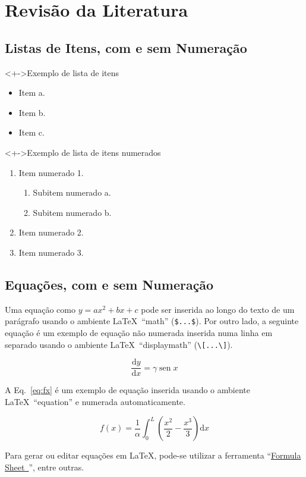 \documentclass[%
  10pt,%
  aspectratio = 43,%
  compress,%
  t,%
  english,%
  brazilian,%
]{beamer}
\begin{document}
\section{Revisão da Literatura}\label{sec:revlit}

\subsection{Listas de Itens, com e sem Numeração}\label{ssec:revlit1}

\begin{frame}
\begin{block}<+->{Exemplo de lista de itens}
\begin{itemize}
\item Item a.
\item Item b.
\item Item c.
\end{itemize}
\end{block}
\begin{block}<+->{Exemplo de lista de itens numerados}
\begin{enumerate}[<+-|alert@+>]
\item Item numerado 1.
\begin{enumerate}[a]
\item Subitem numerado a.
\item Subitem numerado b.
\end{enumerate}
\item Item numerado 2.
\item Item numerado 3.
\end{enumerate}
\end{block}
\end{frame}

\subsection{Equações, com e sem Numeração}\label{ssec:revlit2}

\begin{frame}[fragile = singleslide]
Uma equação como $y = a x^2 + b x + c$ pode ser inserida ao longo do texto de um parágrafo usando o ambiente \LaTeX\ \enquote{math} (\verb|$...$|).
Por outro lado, a seguinte equação é um exemplo de equação não numerada inserida numa linha em separado usando o ambiente \LaTeX\ \enquote{displaymath} (\verb|\[...\]|).
\begin{block}{}
\[
\frac{\mathrm{d} y}{\mathrm{d} x} = \gamma \operatorname{sen} x
\]
\end{block}
A Eq.~\eqref{eq:fx} é um exemplo de equação inserida usando o ambiente \LaTeX\ \enquote{equation} e numerada automaticamente.
\begin{block}{}
\begin{equation}\label{eq:fx}
f(x) = \frac{1}{\alpha} \int_0^L \left(\frac{x^2}{2} - \frac{x^3}{3}\right) \mathrm{d} x
\end{equation}
\end{block}
Para gerar ou editar equações em \LaTeX, pode-se utilizar a ferramenta \enquote{\href{http://formulasheet.com/}{Formula Sheet~\linkicon}}, entre outras.
\end{frame}
\end{document}
